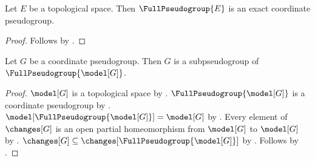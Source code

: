 \begin{theorem}\label{full_pseudogroup_is_exact}
    Let $E$ be a topological space.
    Then $\FullPseudogroup{E}$ is an exact coordinate pseudogroup.
\end{theorem}
\begin{proof}
    Follows by .
\end{proof}

\begin{theorem}\label{full_pseudogroup_maximal}
    Let $G$ be a coordinate pseudogroup.
    Then $G$ is a subpseudogroup of $\FullPseudogroup{\model[G]}$.
\end{theorem}
\begin{proof}
    $\model[G]$ is a topological space by .
    $\FullPseudogroup{\model[G]}$ is a coordinate pseudogroup by
        .
    $\model[\FullPseudogroup{\model[G]}]=\model[G]$ by
        .
    Every element of $\changes[G]$ is an open partial homeomorphism from
        $\model[G]$ to $\model[G]$ by .
    $\changes[G]\subseteq\changes[\FullPseudogroup{\model[G]}]$ by
        .
    Follows by .
\end{proof}
